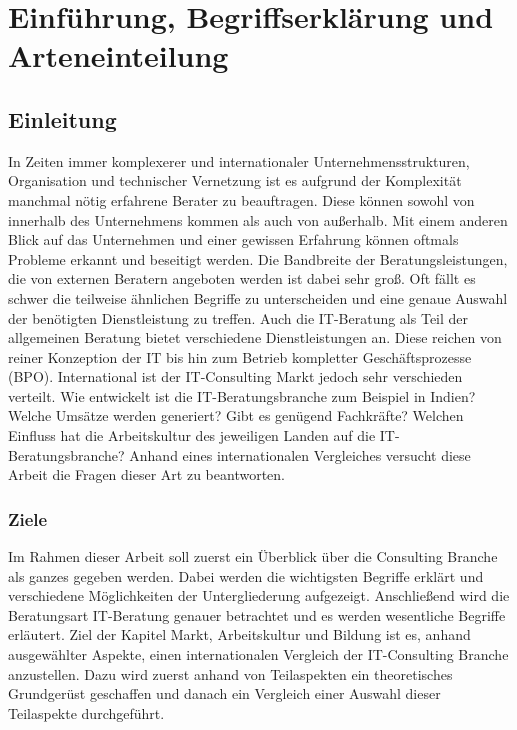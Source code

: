 \chapter{Einführung, Begriffserklärung und Arteneinteilung}
\section{Einleitung}
In Zeiten immer komplexerer und internationaler Unternehmensstrukturen, Organisation und technischer Vernetzung ist es aufgrund der Komplexität manchmal nötig erfahrene Berater zu beauftragen. Diese können sowohl von innerhalb des Unternehmens kommen als auch von außerhalb. Mit einem anderen Blick auf das Unternehmen und einer gewissen Erfahrung können oftmals Probleme erkannt und beseitigt werden. Die Bandbreite der Beratungsleistungen, die von externen Beratern angeboten werden ist dabei sehr groß. Oft fällt es schwer die teilweise ähnlichen Begriffe zu unterscheiden und eine genaue Auswahl der benötigten Dienstleistung zu treffen. Auch die IT-Beratung als Teil der allgemeinen Beratung bietet verschiedene Dienstleistungen an. Diese reichen von reiner Konzeption der IT bis hin zum Betrieb kompletter Geschäftsprozesse (BPO). International ist der IT-Consulting Markt jedoch sehr verschieden verteilt. Wie entwickelt ist die IT-Beratungsbranche zum Beispiel in Indien? Welche Umsätze werden generiert? Gibt es genügend Fachkräfte? Welchen Einfluss hat die Arbeitskultur des jeweiligen Landen auf die IT-Beratungsbranche? Anhand eines internationalen Vergleiches versucht diese Arbeit die Fragen dieser Art zu beantworten.

\subsection*{Ziele}
Im Rahmen dieser Arbeit soll zuerst ein Überblick über die Consulting Branche als ganzes gegeben werden. Dabei werden die wichtigsten Begriffe erklärt und verschiedene Möglichkeiten der Untergliederung aufgezeigt. Anschließend wird die Beratungsart IT-Beratung genauer betrachtet und es werden wesentliche Begriffe erläutert. Ziel der Kapitel Markt, Arbeitskultur und Bildung ist es, anhand ausgewählter Aspekte, einen internationalen Vergleich der IT-Consulting Branche anzustellen. Dazu wird zuerst anhand von Teilaspekten ein theoretisches Grundgerüst geschaffen und danach ein Vergleich einer Auswahl dieser Teilaspekte durchgeführt.
